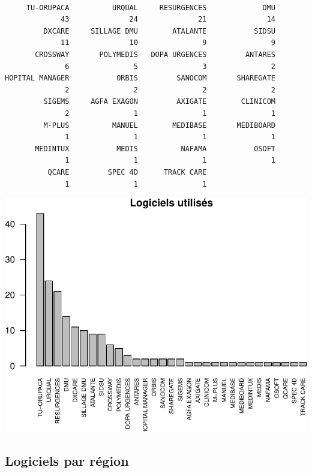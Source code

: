 \documentclass[]{article}
\begin{document}
\begin{verbatim}

     TU-ORUPACA          URQUAL     RESURGENCES             DMU 
             43              24              21              14 
         DXCARE     SILLAGE DMU        ATALANTE           SIDSU 
             11              10               9               9 
       CROSSWAY       POLYMEDIS   DOPA URGENCES         ANTARES 
              6               5               3               2 
HOPITAL MANAGER           ORBIS         SANOCOM       SHAREGATE 
              2               2               2               2 
         SIGEMS     AGFA EXAGON         AXIGATE        CLINICOM 
              2               1               1               1 
         M-PLUS          MANUEL        MEDIBASE       MEDIBOARD 
              1               1               1               1 
       MEDINTUX           MEDIS          NAFAMA           OSOFT 
              1               1               1               1 
          QCARE         SPEC 4D      TRACK CARE 
              1               1               1 
\end{verbatim}

\includegraphics{septembre2015_files/figure-latex/unnamed-chunk-3-1.pdf}

\subsection{Logiciels par région}\label{logiciels-par-region}
\end{document}
